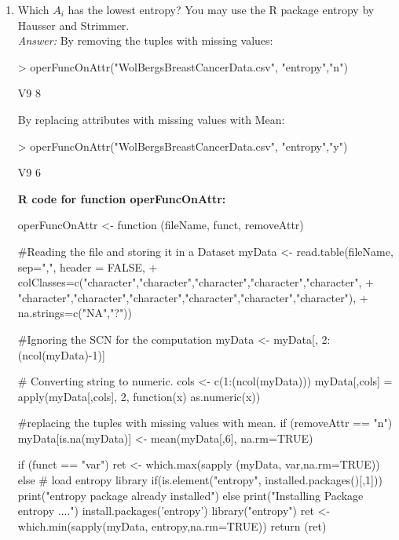 \documentclass{article}
\begin{document}
\begin{enumerate}
\begin{enumerate}
		\item Which $A_i$ has the lowest entropy? You may use the R package entropy by Hausser and Strimmer. \\
		\emph{Answer:} 
By removing the tuples with missing values:\\
\begin{Sinput}
> operFuncOnAttr("WolBergsBreastCancerData.csv", "entropy","n")
\end{Sinput}
\begin{Soutput}
V9 
 8  
\end{Soutput}

By replacing attributes with missing values with Mean:\\
\begin{Sinput}
> operFuncOnAttr("WolBergsBreastCancerData.csv", "entropy","y")
\end{Sinput}
\begin{Soutput}
V9 
6
\end{Soutput}

\textbf{R code for function operFuncOnAttr:}
\begin{Sinput}

operFuncOnAttr <- function (fileName, funct, removeAttr) {

	#Reading the file and storing it in a Dataset
	myData <- read.table(fileName, sep=",", header = FALSE, 
+ colClasses=c("character","character","character","character","character",
+ "character","character","character","character","character","character"), 
+ na.strings=c("NA","?"))
	
	#Ignoring the SCN for the computation
	myData <- myData[, 2:(ncol(myData)-1)]
	
	# Converting string to numeric.
	cols <- c(1:(ncol(myData)))
	myData[,cols] = apply(myData[,cols], 2, function(x) as.numeric(x))
	
	#replacing the tuples with missing values with mean.
	if (removeAttr == "n"){
	myData[is.na(myData)] <- mean(myData[,6], na.rm=TRUE)
	}
	
	if (funct == "var") {
		ret <- which.max(sapply (myData, var,na.rm=TRUE))
	} else {
		# load entropy library
		if(is.element("entropy", installed.packages()[,1])) { 
			print("entropy package already installed") 
		} else {
			print("Installing Package entropy ....") 
			install.packages('entropy')
		}
		library("entropy")
		ret <- which.min(sapply(myData, entropy,na.rm=TRUE))
	}
	return (ret)
}
\end{Sinput}



\end{enumerate}
\end{enumerate}
\end{document}
